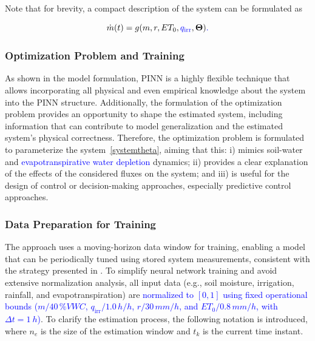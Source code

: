 \documentclass[pdflatex,sn-nature]{sn-jnl}%
\theoremstyle{thmstyleone}%
\theoremstyle{thmstyletwo}%
\theoremstyle{thmstylethree}%
\begin{document}
Note that for brevity, a compact description of the system can be formulated as 

\begin{equation}
    \label{systemtheta}
    \dot{m}(t) = g(m,r,ET_0,\textcolor{blue}{q_{\mathrm{irr}}},\boldsymbol{\Theta})\textcolor{blue}{.}
\end{equation}


\subsubsection{Optimization Problem and Training}\label{subsec2}

As shown in the model formulation, PINN is a highly flexible technique that allows incorporating all physical and even empirical knowledge about the system into the PINN structure. Additionally, the formulation of the optimization problem provides an opportunity to shape the estimated system, including information that can contribute to model generalization and the estimated system's physical correctness. Therefore, the optimization problem is formulated to parameterize the system\textcolor{blue}{~\eqref{systemtheta}}, aiming that this: i) mimics soil-water and \textcolor{blue}{evapotranspirative water depletion} dynamics; ii) provides a clear explanation of the effects of the considered fluxes on the system; and iii) is useful for the design of control or decision-making approaches, especially predictive control approaches.

\subsubsection{Data Preparation for Training}

The approach uses a moving-horizon data window for training, enabling a model that can be periodically tuned using stored system measurements, consistent with the strategy presented in \cite{condeforecast2024}\textcolor{blue}{\cite{Alessandri2017}}. To simplify neural network training and avoid extensive normalization analysis, all input data (e.g., soil moisture, irrigation, rainfall, and evapotranspiration) are \textcolor{blue}{normalized to $[0, 1]$ using fixed operational bounds ($m/40\,\si{\%VWC}$, $q_{\mathrm{irr}}/1.0\,\si{h/h}$, $r/30\,\si{mm/h}$, and $ET_0/0.8\,\si{mm/h}$, with $\Delta t = \SI{1}{h}$)}. To clarify the estimation process, the following notation is introduced, where \( n_e \) is the size of the estimation window and \( t_k \) is the current time instant.
\end{document}
